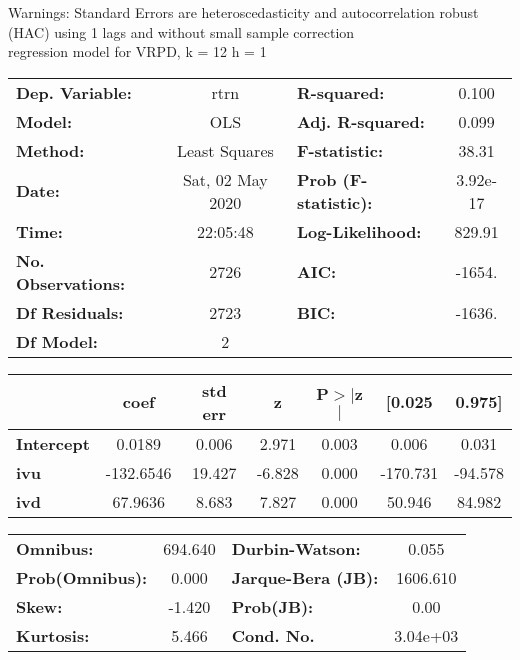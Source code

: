 Warnings: \newline
 [1] Standard Errors are heteroscedasticity and autocorrelation robust (HAC) using 1 lags and without small sample correction\\ 

regression model for VRPD, k = 12 h = 1\begin{center}
\begin{tabular}{lclc}
\toprule
\textbf{Dep. Variable:}    &       rtrn       & \textbf{  R-squared:         } &     0.100   \\
\textbf{Model:}            &       OLS        & \textbf{  Adj. R-squared:    } &     0.099   \\
\textbf{Method:}           &  Least Squares   & \textbf{  F-statistic:       } &     38.31   \\
\textbf{Date:}             & Sat, 02 May 2020 & \textbf{  Prob (F-statistic):} &  3.92e-17   \\
\textbf{Time:}             &     22:05:48     & \textbf{  Log-Likelihood:    } &    829.91   \\
\textbf{No. Observations:} &        2726      & \textbf{  AIC:               } &    -1654.   \\
\textbf{Df Residuals:}     &        2723      & \textbf{  BIC:               } &    -1636.   \\
\textbf{Df Model:}         &           2      & \textbf{                     } &             \\
\bottomrule
\end{tabular}
\begin{tabular}{lcccccc}
                   & \textbf{coef} & \textbf{std err} & \textbf{z} & \textbf{P$> |$z$|$} & \textbf{[0.025} & \textbf{0.975]}  \\
\midrule
\textbf{Intercept} &       0.0189  &        0.006     &     2.971  &         0.003        &        0.006    &        0.031     \\
\textbf{ivu}       &    -132.6546  &       19.427     &    -6.828  &         0.000        &     -170.731    &      -94.578     \\
\textbf{ivd}       &      67.9636  &        8.683     &     7.827  &         0.000        &       50.946    &       84.982     \\
\bottomrule
\end{tabular}
\begin{tabular}{lclc}
\textbf{Omnibus:}       & 694.640 & \textbf{  Durbin-Watson:     } &    0.055  \\
\textbf{Prob(Omnibus):} &   0.000 & \textbf{  Jarque-Bera (JB):  } & 1606.610  \\
\textbf{Skew:}          &  -1.420 & \textbf{  Prob(JB):          } &     0.00  \\
\textbf{Kurtosis:}      &   5.466 & \textbf{  Cond. No.          } & 3.04e+03  \\
\bottomrule
\end{tabular}
\end{center}

